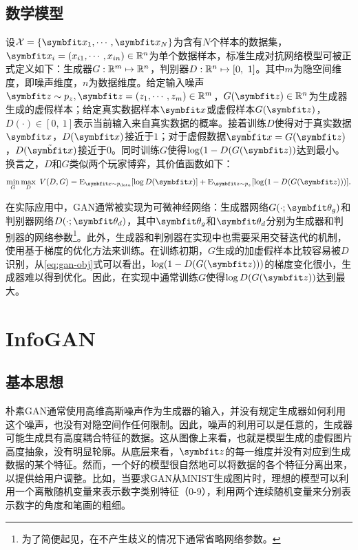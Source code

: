 \subsection{数学模型}
设$\Set{X} = \{\bd{x}_1, \cdots, \bd{x}_N\}$为含有$N$个样本的数据集，$\bd{x}_i = (x_{i1}, \cdots, x_{in}) \in \reals^n$为单个数据样本，标准生成对抗网络模型可被正式定义如下：生成器$G: \mathbb{R}^m \mapsto \mathbb{R}^n$，判别器$D: \mathbb{R}^n \mapsto [0, ~1]$。其中$m$为隐空间维度，即噪声维度，$n$为数据维度。给定输入噪声$\bd{z} \sim p_z, \bd{z} = (z_1, \cdots, z_m) \in \reals^m$，$G(\bd{z}) \in \reals^n$为生成器生成的虚假样本；给定真实数据样本$\bd{x}$或虚假样本$G(\bd{z})$，$D(\cdot) \in [0,~1]$表示当前输入来自真实数据的概率。接着训练$D$使得对于真实数据$\bd{x}$，$D(\bd{x})$接近于$1$；对于虚假数据$\tilde{\bd{x}} = G(\bd{z})$，$D(\tilde{\bd{x}})$接近于$0$。同时训练$G$使得$\log(1 - D(G(\bd{z}))$达到最小。换言之，$D$和$G$类似两个玩家博弈，其价值函数如下：
\begin{equation}
  \min_G\max_D ~V(D,G) =
    \E_{\bd{x} \sim p_{\text{data}}}[\log D(\bd{x})] + 
    \E_{\bd{z} \sim p_z}[\log(1-D(G(\bd{z})))].
  \label{eq:gan-obj}
\end{equation}

在实际应用中，GAN通常被实现为可微神经网络：生成器网络$G(\cdot; \bd{\theta}_g)$和判别器网络$D(\cdot; \bd{\theta}_d)$，其中$\bd{\theta}_g$和$\bd{\theta}_d$分别为生成器和判别器的网络参数\footnote{为了简便起见，在不产生歧义的情况下通常省略网络参数。}。此外，生成器和判别器在实现中也需要采用交替迭代的机制，使用基于梯度的优化方法来训练。在训练初期，$G$生成的加虚假样本比较容易被$D$识别，从\eqref{eq:gan-obj}式可以看出，$\log(1 - D(G(\bd{z})))$的梯度变化很小，生成器难以得到优化。因此，在实现中通常训练$G$使得$\log D(G(\bd{z}))$达到最大。

\section{InfoGAN}\label{sec:infogan}
\subsection{基本思想}
朴素GAN通常使用高维高斯噪声作为生成器的输入，并没有规定生成器如何利用这个噪声，也没有对隐空间作任何限制。因此，噪声的利用可以是任意的，生成器可能生成具有高度耦合特征的数据。这从图像上来看，也就是模型生成的虚假图片高度抽象，没有明显轮廓。从底层来看，$\bd{z}$的每一维度并没有对应到生成数据的某个特征。然而，一个好的模型很自然地可以将数据的各个特征分离出来，以提供给用户调整。比如，当要求GAN从MNIST\citep{lecun1989backpropagation}生成图片时，理想的模型可以利用一个离散随机变量来表示数字类别特征（0-9），利用两个连续随机变量来分别表示数字的角度和笔画的粗细。


